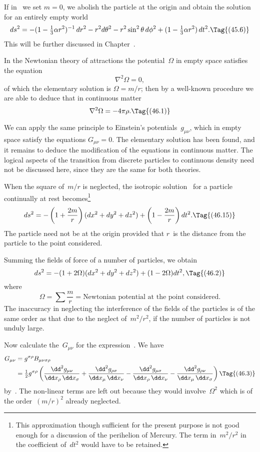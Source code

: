 \documentclass[12pt]{book}
\begin{document}
If in~ we set $m = 0$, we abolish the particle at the origin and obtain
the solution for an entirely empty world
\[
ds^{2} = -(1 - \tfrac{1}{3}\alpha r^{2})^{-1}\, dr^{2}
- r^{2} d\theta^2 - r^{2} \sin^{2}\theta\, d\phi^{2}
+ (1 - \tfrac{1}{3}\alpha r^{2})\, dt^{2}.
\Tag{(45.6)}
\]
This will be further discussed in Chapter~\@.

%
%

In the Newtonian theory of attractions the potential~$\Omega$ in empty space
satisfies the equation
\[
\nabla^2\Omega = 0,
\]
of which the elementary solution is $\Omega = m/r$; then by a well-known procedure
we are able to deduce that in continuous matter
\[
\nabla^2\Omega = -4\pi\rho.
\Tag{(46.1)}
\]

We can apply the same principle to Einstein's potentials~$g_{\mu\nu}$, which in
empty space satisfy the equations $G_{\mu\nu} = 0$. The elementary solution has been
found, and it remains to deduce the modification of the equations in continuous
matter. The logical aspects of the transition from discrete particles to continuous
density need not be discussed here, since they are the same for both
theories.

When the square of~$m/r$ is neglected, the isotropic solution~ for a
particle continually at rest becomes\footnote
  {This approximation though sufficient for the present purpose is not good enough for a
  discussion of the perihelion of Mercury. The term in~$m^{2}/r^{2}$ in the coefficient of~$dt^{2}$ would have to
  be retained.}
\[
ds^{2} = -\left(1 + \frac{2m}{r}\right) (dx^{2} + dy^{2} + dz^{2}) + \left(1 - \frac{2m}{r}\right) dt^{2}.
\Tag{(46.15)}
\]
The particle need not be at the origin provided that $r$~is the distance from
the particle to the point considered.

Summing the fields of force of a number of particles, we obtain
\[
ds^{2} = -(1 + 2\Omega) (dx^{2} + dy^{2} + dz^{2}) + (1 - 2\Omega) dt^{2},
\Tag{(46.2)}
\]
where
\[
\Omega = \sum \frac{m}{r}
= \text{Newtonian potential at the point considered.}
\]
The inaccuracy in neglecting the interference of the fields of the particles is
of the same order as that due to the neglect of~$m^{2}/r^{2}$, if the number of particles
is not unduly large.

Now calculate the~$G_{\mu\nu}$ for the expression~. We have
\begin{align*}
  G_{\mu\nu} &= g^{\sigma\rho} B_{\mu\nu\sigma\rho} \\
  &= \tfrac{1}{2}g^{\sigma\rho} \left(
  \frac{\dd^{2} g_{\mu\nu}}{\dd x_{\rho}\, \dd x_{\sigma}}
  + \frac{\dd^{2} g_{\rho\sigma}}{\dd x_{\mu}\, \dd x_{\nu}}
  - \frac{\dd^{2} g_{\mu\sigma}}{\dd x_{\rho}\, \dd x_{\nu}}
  - \frac{\dd^{2} g_{\rho\nu}}{\dd x_{\mu}\, \dd x_{\sigma}}\right)
  \Tag{(46.3)}
\end{align*}
by~. The non\hyp{}linear terms are left out because they would involve~$\Omega^2$
which is of the order~$(m/r)^{2}$ already neglected.
\end{document}
